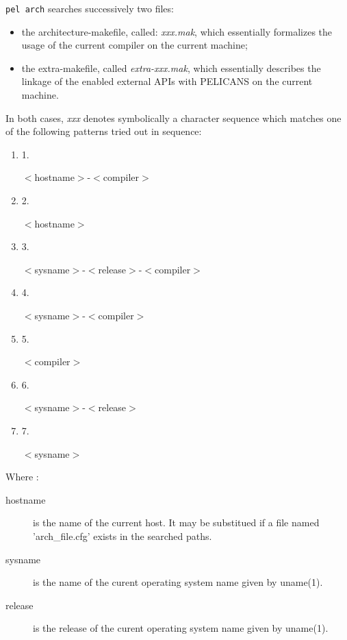 \documentclass{article}
\begin{document}
\texttt{pel arch} searches successively two files:

\begin{itemize}

\item 

the architecture-makefile, called:  \emph{xxx.mak},  which essentially formalizes
the usage of the current compiler on the current machine;


\item 

the extra-makefile, called \emph{extra-xxx.mak}, which essentially describes the
linkage of the enabled external APIs with PELICANS on the current machine.

\end{itemize}


In both cases, \emph{xxx} denotes symbolically a character sequence which matches
one of the following patterns tried out in sequence:

\begin{enumerate}

\item 1.

$<$hostname$>$-$<$compiler$>$


\item 2.

$<$hostname$>$


\item 3.

$<$sysname$>$-$<$release$>$-$<$compiler$>$


\item 4.

$<$sysname$>$-$<$compiler$>$


\item 5.

$<$compiler$>$


\item 6.

$<$sysname$>$-$<$release$>$


\item 7.

$<$sysname$>$

\end{enumerate}


Where :

\begin{description}

\item[hostname] \mbox{}

is the name of the current host. It may be substitued if a file named
'arch\_file.cfg' exists in the searched paths.


\item[sysname] \mbox{}

is the name of the curent operating system name given by uname(1).


\item[release] \mbox{}

is the release of the curent operating system name given by uname(1).

\end{description}
\end{document}

